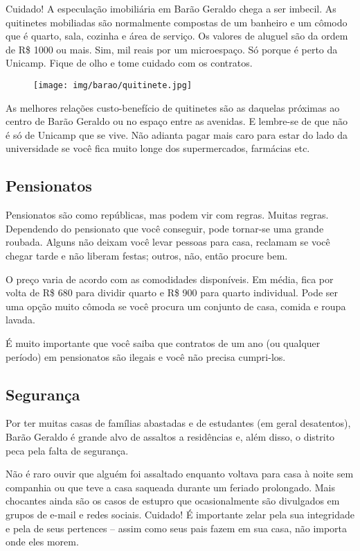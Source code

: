 Cuidado! A especulação imobiliária em Barão Geraldo chega a ser imbecil. As
quitinetes mobiliadas são normalmente compostas de um banheiro e um cômodo que
é quarto, sala, cozinha e área de serviço. Os valores de aluguel são da ordem
de R\$ 1000 ou mais. Sim, mil reais por um microespaço. Só porque é perto da
Unicamp. Fique de olho e tome cuidado com os contratos.

\begin{figure}[h!]
    \centering
    \texttt{[image: img/barao/quitinete.jpg]}
\end{figure}

As melhores relações custo-benefício de quitinetes são as daquelas próximas ao
centro de Barão Geraldo ou no espaço entre as avenidas. E lembre-se de que não
é só de Unicamp que se vive. Não adianta pagar mais caro para estar do lado da
universidade se você fica muito longe dos supermercados, farmácias etc.

\subsection{Pensionatos}

Pensionatos são como repúblicas, mas podem vir com regras. Muitas regras.
Dependendo do pensionato que você conseguir, pode tornar-se uma grande roubada.
Alguns não deixam você levar pessoas para casa, reclamam se você chegar tarde e
não liberam festas; outros, não, então procure bem.

O preço varia de acordo com as comodidades disponíveis. Em média, fica por
volta de R\$ 680 para dividir quarto e R\$ 900 para quarto individual. Pode ser
uma opção muito cômoda se você procura um conjunto de casa, comida e roupa
lavada.

É muito importante que você saiba que contratos de um ano (ou qualquer período)
em pensionatos são ilegais e você não precisa cumpri-los.

\subsection{Segurança}

Por ter muitas casas de famílias abastadas e de estudantes (em geral
desatentos), Barão Geraldo é grande alvo de assaltos a residências e, além
disso, o distrito peca pela falta de segurança.

Não é raro ouvir que alguém foi assaltado enquanto voltava para casa à noite
sem companhia ou que teve a casa saqueada durante um feriado prolongado. Mais
chocantes ainda são os casos de estupro que ocasionalmente são divulgados em
grupos de e-mail e redes sociais. Cuidado! É importante zelar pela sua
integridade e pela de seus pertences -- assim como seus pais fazem em sua casa,
não importa onde eles morem.

